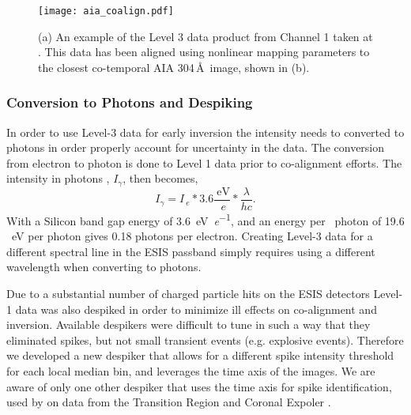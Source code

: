   \begin{figure}[htb!]
	\centering
	\texttt{[image: aia\_coalign.pdf]}
	\caption{(a) An example of the Level 3 data product from Channel 1 taken at \levthreetime. This data has been aligned using nonlinear mapping parameters to the closest co-temporal AIA 304\,\AA\ image, shown in (b). }
	\label{fig:coalign}
\end{figure}
    	
    
\subsubsection{Conversion to Photons and Despiking}
In order to use Level-3 data for early inversion the intensity needs to  converted to photons in order properly account for uncertainty in the data.
The conversion from electron to photon is done to Level 1 data prior to co-alignment efforts.
The intensity in photons , $I_{\gamma}$, then becomes,
\begin{equation}
   I_{\gamma} = I_{\SI{}{\elementarycharge}} * 3.6 \frac{\SI{}{\electronvolt}}{\SI{}{\elementarycharge}} * \frac{\lambda}{hc}.
\end{equation}
With a Silicon band gap energy of \SI[per-mode=symbol]{3.6}{\electronvolt\per\elementarycharge}, and an energy per \ov \ photon 
of 19.6 \SI{}{\electronvolt} per photon gives 0.18 photons per electron.
Creating Level-3 data for a different spectral line in the ESIS passband simply requires using a different wavelength when converting to photons.


Due to a substantial number of charged particle hits on the ESIS detectors Level-1 data was also despiked in order to minimize ill effects on co-alignment and inversion.
Available despikers were difficult to tune in such a way that they eliminated spikes, but not small transient events (e.g. explosive events).
Therefore we developed a new despiker that allows for a different spike intensity threshold for each local median bin, and leverages the time axis of the images.
We are aware of only one other despiker that uses the time axis for spike identification, used by \citet{Aschwanden2000(trace_unspike_time)} on data from the Transition Region and Coronal Expoler \citep[TRACE]{handy1999}.

